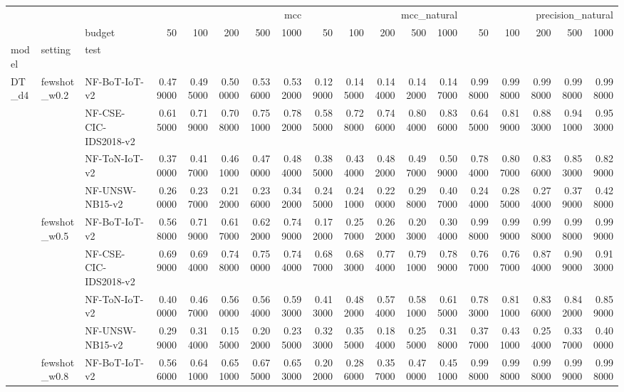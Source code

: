 \begin{tabular}{lllrrrrrrrrrrrrrrr}
\toprule
 &  &  & \multicolumn{5}{r}{mcc} & \multicolumn{5}{r}{mcc_natural} & \multicolumn{5}{r}{precision_natural} \\
 &  & budget & 50 & 100 & 200 & 500 & 1000 & 50 & 100 & 200 & 500 & 1000 & 50 & 100 & 200 & 500 & 1000 \\
model & setting & test &  &  &  &  &  &  &  &  &  &  &  &  &  &  &  \\
\midrule
\multirow[t]{24}{*}{DT_d4} & \multirow[t]{4}{*}{fewshot_w0.2} & NF-BoT-IoT-v2 & 0.479000 & 0.495000 & 0.500000 & 0.536000 & 0.532000 & 0.129000 & 0.145000 & 0.144000 & 0.142000 & 0.147000 & 0.998000 & 0.998000 & 0.998000 & 0.998000 & 0.998000 \\
 &  & NF-CSE-CIC-IDS2018-v2 & 0.615000 & 0.719000 & 0.708000 & 0.751000 & 0.782000 & 0.585000 & 0.728000 & 0.746000 & 0.804000 & 0.836000 & 0.645000 & 0.819000 & 0.883000 & 0.941000 & 0.953000 \\
 &  & NF-ToN-IoT-v2 & 0.370000 & 0.417000 & 0.461000 & 0.470000 & 0.484000 & 0.385000 & 0.434000 & 0.482000 & 0.497000 & 0.509000 & 0.784000 & 0.807000 & 0.836000 & 0.853000 & 0.829000 \\
 &  & NF-UNSW-NB15-v2 & 0.260000 & 0.237000 & 0.212000 & 0.236000 & 0.342000 & 0.245000 & 0.241000 & 0.220000 & 0.298000 & 0.407000 & 0.244000 & 0.285000 & 0.274000 & 0.379000 & 0.428000 \\
\cline{2-18}
 & \multirow[t]{4}{*}{fewshot_w0.5} & NF-BoT-IoT-v2 & 0.568000 & 0.719000 & 0.617000 & 0.622000 & 0.749000 & 0.172000 & 0.257000 & 0.262000 & 0.203000 & 0.304000 & 0.998000 & 0.999000 & 0.998000 & 0.998000 & 0.999000 \\
 &  & NF-CSE-CIC-IDS2018-v2 & 0.699000 & 0.694000 & 0.748000 & 0.750000 & 0.744000 & 0.687000 & 0.683000 & 0.774000 & 0.791000 & 0.789000 & 0.767000 & 0.767000 & 0.874000 & 0.909000 & 0.913000 \\
 &  & NF-ToN-IoT-v2 & 0.400000 & 0.467000 & 0.560000 & 0.564000 & 0.593000 & 0.413000 & 0.482000 & 0.574000 & 0.581000 & 0.615000 & 0.783000 & 0.811000 & 0.836000 & 0.842000 & 0.859000 \\
 &  & NF-UNSW-NB15-v2 & 0.299000 & 0.314000 & 0.155000 & 0.202000 & 0.235000 & 0.323000 & 0.355000 & 0.184000 & 0.255000 & 0.318000 & 0.377000 & 0.431000 & 0.254000 & 0.337000 & 0.400000 \\
\cline{2-18}
 & \multirow[t]{4}{*}{fewshot_w0.8} & NF-BoT-IoT-v2 & 0.566000 & 0.641000 & 0.651000 & 0.675000 & 0.653000 & 0.202000 & 0.286000 & 0.357000 & 0.470000 & 0.451000 & 0.998000 & 0.998000 & 0.998000 & 0.999000 & 0.998000 \\

\end{tabular}
